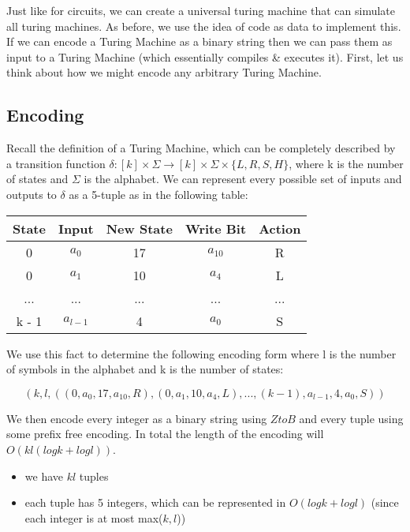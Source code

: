 Just like for circuits, we can create a universal turing machine that can simulate all turing machines. As before, we use the idea of code as data to implement this. If we can encode a Turing Machine as a binary string then we can pass them as input to a Turing Machine (which essentially compiles \& executes it). First, let us think about how we might encode any arbitrary Turing Machine.

\subsection*{Encoding}
Recall the definition of a Turing Machine, which can be completely described by a transition function $\delta: [k] \times \Sigma \rightarrow [k] \times \Sigma \times \{ L, R, S, H \}$, where k is the number of states and $\Sigma$ is the alphabet. We can represent every possible set of inputs and outputs to $\delta$ as a 5-tuple as in the following table:

\vspace{.25cm}
\begin{center}
    \begin{tabular}{|c|c|c|c|c|}
        \hline
        \bf{State} & \bf{Input} & \bf{New State} & \bf{Write Bit} & \bf{Action} \\
        \hline
        0 & $a_0$ & 17 & $a_{10}$ & R \\
        \hline 
        0 & $a_1$ & 10 & $a_4$ & L \\
        \hline 
        ... & ... & ... & ... & ... \\
        \hline 
        k - 1 & $a_{l - 1}$ & 4 & $a_0$ & S \\
        \hline 
    \end{tabular}
\end{center}
\vspace{.25cm}

We use this fact to determine the following encoding form where l is the number of symbols in the alphabet and k is the number of states:

\[
    (k, l, ((0, a_0, 17, a_10, R), (0, a_1, 10, a_4, L), ..., (k - 1), a_{l-1}, 4, a_0, S))
\]

We then encode every integer as a binary string using $ZtoB$ and every tuple using some prefix free encoding. In total the length of the encoding will $O(kl(logk + logl))$. 
\begin{itemize}
    \item we have $kl$ tuples
    \item each tuple has 5 integers, which can be represented in $O(logk + logl)$ (since each integer is at most max($k, l$))
\end{itemize}

